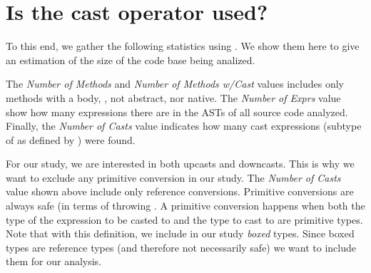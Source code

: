     








\section{Is the cast operator used?}

\label{sec:stats}

To this end, we gather the following statistics using \ql{}.
We show them here to give an estimation of the size of the code base being analized.


The \emph{Number of Methods} and \emph{Number of Methods w/Cast} values includes only methods with a body, \ie{}, not abstract, nor native.
The \emph{Number of Exprs} value show how many expressions there are in the ASTs of all source code analyzed.
Finally, the \emph{Number of Casts} value indicates how many cast expressions (subtype of  as defined by \ql{}) were found.

For our study, we are interested in both upcasts and downcasts.
This is why we want to exclude any primitive conversion in our study.
The \emph{Number of Casts} value shown above include only reference conversions.
Primitive conversions are always safe (in terms of throwing .
A primitive conversion happens when both the type of the expression to be casted to and the type to cast to are primitive types.
Note that with this definition, we include in our study \emph{boxed} types.
Since boxed types are reference types (and therefore not necessarily safe)
we want to include them for our analysis.

